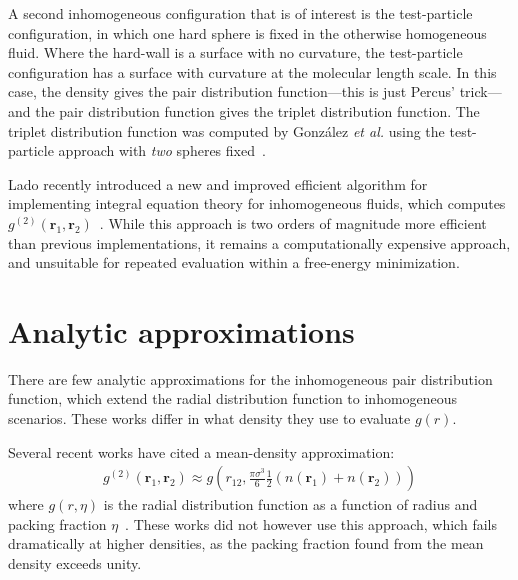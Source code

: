 \documentclass[letterpaper,twocolumn,amsmath,amssymb,pre]{revtex4-1}
\newcommand{\rr}{\textbf{r}}
\begin{document}
A second inhomogeneous configuration that is of interest is the
test-particle configuration, in which one hard sphere is fixed in the
otherwise homogeneous fluid.  Where the hard-wall is a surface with no
curvature, the test-particle configuration has a surface with
curvature at the molecular length scale.  In this case, the density
gives the pair distribution function---this is just Percus'
trick---and the pair distribution function gives the triplet
distribution function.  The triplet distribution function was computed
by Gonz\'alez \emph{et al.} using the test-particle approach with
\emph{two} spheres fixed~\cite{gonzalez1999test}.

Lado recently introduced a new and improved efficient algorithm for
implementing integral equation theory for inhomogeneous fluids, which
computes $g^{(2)}(\rr_1,\rr_2)$~\cite{lado2009efficient}.  While this
approach is two orders of magnitude more efficient than previous
implementations, it remains a computationally expensive approach, and
unsuitable for repeated evaluation within a free-energy minimization.

\section{Analytic approximations}
There are few analytic approximations for the inhomogeneous pair
distribution function, which extend the radial distribution function
to inhomogeneous scenarios.  These works differ in what density they
use to evaluate $g(r)$.

Several recent works have cited a
mean-density approximation:
\begin{align}
  g^{(2)}(\rr_1,\rr_2) \approx g\left(r_{12}, \frac{\pi\sigma^3}{6}\tfrac12
  (n(\rr_1)+n(\rr_2))\right)
\end{align}
where $g(r,\eta)$ is the radial distribution function as a function of
radius and packing fraction $\eta$~\cite{gloor2007prediction,
  gross2009density}.  These works did not however use this approach,
which fails dramatically at higher densities, as the packing fraction
found from the mean density exceeds unity.
\end{document}
